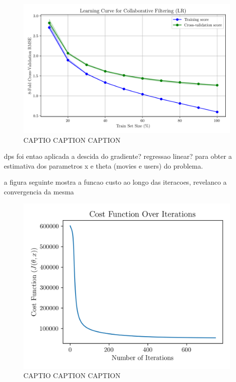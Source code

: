 \documentclass[conference]{IEEEtran}
\begin{document}
\begin{figure}[H]
    \centering
    \includegraphics[width=1\linewidth]{assets/model01_learning_curve.png}
    \caption{CAPTIO CAPTION CAPTION}
    \label{fig:model01_cost_function}
\end{figure}


dps foi entao aplicada a descida do gradiente? regressao linear? para obter a estimativa dos parametros x e theta (movies e users) do problema.

a figura seguinte mostra a funcao custo ao longo das iteracoes, revelanco a convergencia da mesma

\begin{figure}[H]
    \centering
    \includegraphics[width=1\linewidth]{assets/model01_cost_function.png}
    \caption{CAPTIO CAPTION CAPTION}
    \label{fig:model01_cost_function}
\end{figure}
\end{document}
